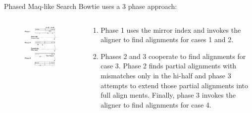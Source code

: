 \documentclass[mathserif]{beamer}
\begin{document}
\begin{frame}{Phased Maq-like Search}
    Bowtie uses a 3 phase approach:
    \begin{columns}
        \begin{column}{.3\textwidth}
        \begin{figure}
            \includegraphics[scale=.25]{media/fig3.png}
        \end{figure}
        \end{column}
        \begin{column}{.7\textwidth}
            \begin{enumerate}
            \item Phase 1 uses the mirror index and invokes the
            aligner to find alignments for cases 1 and 2. 
            \item Phases 2 and 3 cooperate to find alignments for case 3. Phase 2 finds partial
            alignments with mismatches only in the hi-half and phase 3
            attempts to extend those partial alignments into full align
            ments. Finally, phase 3 invokes the aligner to find alignments
            for case 4.
            \end{enumerate}
        \end{column}
    \end{columns}
\end{frame}
\end{document}

